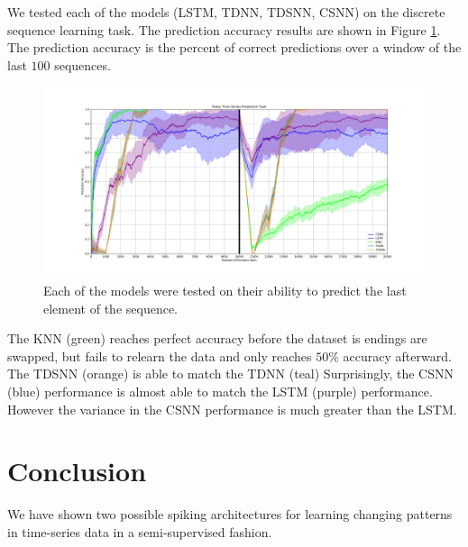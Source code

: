 \documentclass{article}
\begin{document}
We tested each of the models (LSTM, TDNN, TDSNN, CSNN) on the discrete sequence learning task. The prediction accuracy results are shown in Figure \ref{fig:prediction-accuracy}. The prediction accuracy is the percent of correct predictions over a window of the last $100$ sequences.

\begin{figure}[H]
    \centering
    \includegraphics[width=0.9\linewidth]{../results/artificial.png}
    \caption{Each of the models were tested on their ability to predict the last element of the sequence.}
    \label{fig:prediction-accuracy}
\end{figure}

The KNN (green) reaches perfect accuracy before the dataset is endings are swapped, but fails to relearn the data and only reaches $50\%$ accuracy afterward. The TDSNN (orange) is able to match the TDNN (teal) Surprisingly, the CSNN (blue) performance is almost able to match the LSTM (purple) performance. However the variance in the CSNN performance is much greater than the LSTM.




\section*{Conclusion}

We have shown two possible spiking architectures for learning changing patterns in time-series data in a semi-supervised fashion.


\newpage
\printbibliography[title={References}]
\end{document}
